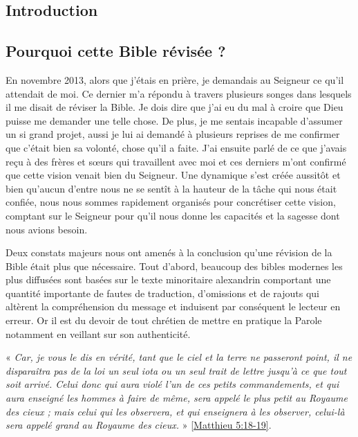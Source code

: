 \begin{center}{\LARGE \section*{Introduction}}\end{center}

\subsection*{Pourquoi cette Bible révisée ?}

En novembre 2013, alors que j'étais en prière, je demandais au Seigneur ce qu'il attendait de moi. Ce dernier m'a répondu à travers plusieurs songes dans lesquels il me disait de réviser la Bible. Je dois dire que j'ai eu du mal à croire que Dieu puisse me demander une telle chose. De plus, je me sentais incapable d'assumer un si grand projet, aussi je lui ai demandé à plusieurs reprises de me confirmer que c'était bien sa volonté, chose qu'il a faite. J'ai ensuite parlé de ce que j'avais reçu à des frères et sœurs qui travaillent avec moi et ces derniers m'ont confirmé que cette vision venait bien du Seigneur. Une dynamique s'est créée aussitôt et bien qu'aucun d'entre nous ne se sentît à la hauteur de la tâche qui nous était confiée, nous nous sommes rapidement organisés pour concrétiser cette vision, comptant sur le Seigneur pour qu'il nous donne les capacités et la sagesse dont nous avions besoin. 

Deux constats majeurs nous ont amenés à la conclusion qu'une révision de la Bible était plus que nécessaire. Tout d'abord, beaucoup des bibles modernes les plus diffusées sont basées sur le texte minoritaire alexandrin comportant une quantité importante de fautes de traduction, d'omissions et de rajouts qui altèrent la compréhension du message et induisent par conséquent le lecteur en erreur. Or il est du devoir de tout chrétien de mettre en pratique la Parole notamment en veillant sur son authenticité.

« \emph{Car, je vous le dis en vérité, tant que le ciel et la terre ne passeront point, il ne disparaîtra pas de la loi un seul iota ou un seul trait de lettre jusqu'à ce que tout soit arrivé. Celui donc qui aura violé l'un de ces petits commandements, et qui aura enseigné les hommes à faire de même, sera appelé le plus petit au Royaume des cieux ; mais celui qui les observera, et qui enseignera à les observer, celui-là sera appelé grand au Royaume des cieux.} » \vref{Matthieu 5:18-19}.

